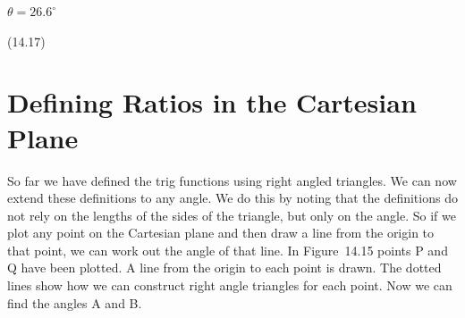 {\begin{mdframed}[linewidth=4, leftmargin=40, rightmargin=40]
\begin{exercise}
\begin{enumerate}[noitemsep, label=\textbf{Step} \textbf{\arabic*}. ]
{\begin{minipage}{\columnwidth}
    \parbox[t]{\mymathboxwidth}{\large\begin{math}
    \theta =26.{6}^{\circ }\end{math}}\hfill
    \parbox[t]{48pt}{\raggedleft 
    (14.17)}
    \end{minipage}\vspace{12pt}\par
    }%
      \end{enumerate}
    \end{exercise}
    \end{mdframed}
    }
\section{Defining Ratios in the Cartesian Plane}
\label{m39411*eip-945}
            \nopagebreak
            \label{m39411*eip-156}So far we have defined the trig functions using right angled triangles. We can now extend these definitions to any angle. We do this by noting that the definitions do not rely on the lengths of the sides of the triangle, but only on the angle. So if we plot any point on the Cartesian plane and then draw a line from the origin to that point, we can work out the angle of that line. In Figure~14.15 points P and Q have been plotted. A line from the origin to each point is drawn. The dotted lines show how we can construct right angle triangles for each point. Now we can find the angles A and B.
\par \label{m39411*eip-970}
    \setcounter{subfigure}{0}

